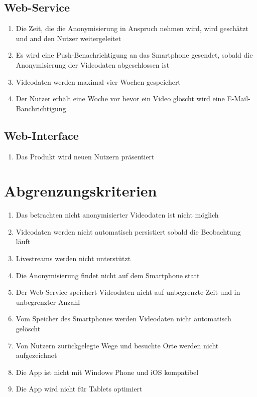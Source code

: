 \subsection{Web-Service}
	\begin{enumerate}
	\renewcommand{\labelenumi}{\textbf{\theenumi}}
	\renewcommand{\theenumi}{WK\arabic{enumi}0}
	\setcounter{enumi}{199}
	\item Die Zeit, die die Anonymisierung in Anspruch nehmen wird, wird geschätzt und and den Nutzer weitergeleitet
	\item Es wird eine Push-Benachrichtigung an das Smartphone gesendet, sobald die Anonymisierung der Videodaten abgeschlossen ist
	\item Videodaten werden maximal vier Wochen gespeichert
	\item Der Nutzer erhält eine Woche vor bevor ein Video glöscht wird eine E-Mail-Banchrichtigung
	\end{enumerate}
\subsection{Web-Interface}
	\begin{enumerate}
	\renewcommand{\labelenumi}{\textbf{\theenumi}}
	\renewcommand{\theenumi}{WK\arabic{enumi}0}
	\setcounter{enumi}{299}
	\item Das Produkt wird neuen Nutzern präsentiert
	\end{enumerate}

\section{Abgrenzungskriterien}
	\begin{enumerate}
	\renewcommand{\labelenumi}{\textbf{\theenumi}}
	\renewcommand{\theenumi}{AK\arabic{enumi}0}
	\item Das betrachten nicht anonymisierter Videodaten ist nicht möglich
	\item Videodaten werden nicht automatisch persistiert sobald die Beobachtung läuft
	\item Livestreams werden nicht unterstützt
	\item Die Anonymisierung findet nicht auf dem Smartphone statt
	\item Der Web-Service speichert Videodaten nicht auf unbegrenzte Zeit und in unbegrenzter Anzahl
	\item Vom Speicher des Smartphones werden Videodaten nicht automatisch gelöscht
	\item Von Nutzern zurückgelegte Wege und besuchte Orte werden nicht aufgezeichnet
	\item Die App ist nicht mit Windows Phone und iOS kompatibel
	\item Die App wird nicht für Tablets optimiert
	\end{enumerate}